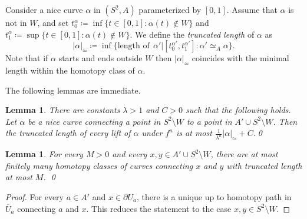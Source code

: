 \documentclass{amsart}
\theoremstyle{plain}
\newtheorem{lemma}[theorem]{Lemma}
\theoremstyle{definition}
\theoremstyle{remark}
\newcommand{\reminder}[1]{\textsl{$\lhd\rhd$#1$\lhd\rhd$}\marginpar{$\lhd\rhd\lhd\rhd\lhd\rhd$}}%
\newcommand{\hide}[1]{}
\renewcommand{\sp}{{\ \ }}
\begin{document}
Consider a nice curve $\alpha$ in $(S^2,A)$ parameterized by $[0,1]$. Assume that $\alpha$ is not in $W$, and set  $t_0^\alpha\coloneq\inf\{t\in[0,1]\colon \alpha(t)\notin W\}$ and $t_1^\alpha\coloneq\sup\{t\in[0,1]\colon \alpha(t)\notin W\}$. We define the  \emph{truncated length} of $\alpha$ as \[| \alpha |_{\simeq} \coloneq \inf\{\text{length of}\sp \alpha'| [t^{\alpha'}_0,t^{\alpha'}_1] \colon  \alpha'\simeq_A \alpha \}.\]
Note that if $\alpha$ starts and ends outside $W$ then $|\alpha|_\simeq$ coincides with the minimal length within the homotopy class of $\alpha$. 




The following lemmas are immediate.



\begin{lemma}
\label{lmm:TrLength:shrinks}
There are constants $\lambda>1$ and $C>0$ such that the following holds. Let $\alpha$ be a nice curve connecting a point in $S^2\setminus W$ to a point in $A'\cup S^2\setminus W$. Then the truncated length of every lift of $\alpha$ under $f^n$ is at most $\frac 1{\lambda^n} |\alpha|_{\simeq}+C$.\qed
\end{lemma}


\begin{lemma}
\label{lmm:TrLength:fin many}
For every $M>0$ and every $x,y\in A'\cup S^2\setminus W$, there are at most finitely many homotopy classes of curves connecting $x$ and $y$ with truncated length at most $M$. \qed
\end{lemma}
\begin{proof}
For every $a\in A'$ and $x\in \partial U_a$, there is a unique up to homotopy path in $\overline U_a$ connecting $a$ and $x$. This reduces the statement to the case $x,y\in S^2\setminus W$.
\end{proof}

\newcommand{\MM}{{\mathcal M}}
\end{document}
